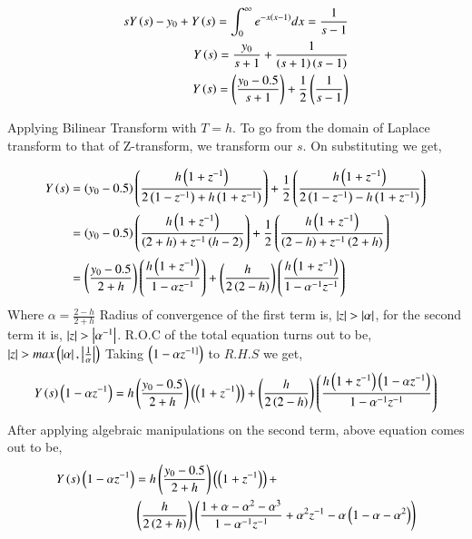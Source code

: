 \documentclass[journal]{IEEEtran}
\begin{document}
\begin{align}
  sY\left(s\right) - y_0 + Y\left(s\right) = \int_0^{\infty} e^{-x\left(x - 1\right) } dx = \frac{1}{s-1}\\
  Y\left(s\right) = \frac{y_0}{s+1} + \frac{1}{\left(s + 1\right) \left(s - 1\right)}\\
  Y\left(s\right) = \left(\frac{y_0 - 0.5}{s+1}\right) + \frac{1}{2}\left(\frac{1}{s-1}\right)
\end{align}

Applying Bilinear Transform with $T=h$. To go from the domain of Laplace transform to that of Z-transform, we transform our $s$. On substituting we get,

\begin{align}
  Y\left(s\right) &= \left(y_0 - 0.5\right)\left(\frac{h\left(1 + z^{-1}\right) }{ 2\left(1 - z^{-1}\right) + h\left(1 + z^{-1}\right) }\right) + \frac{1}{2}\left(\frac{h\left(1 + z^{-1}\right) }{ 2\left(1 - z^{-1}\right) - h\left(1 + z^{-1}\right) }\right)\\
  & = \left(y_0 - 0.5\right)\left(\frac{h\left(1 + z^{-1}\right) }{ \left(2+h\right) + z^{-1}\left(h-2\right) } \right) +\frac{1}{2}\left(\frac{h\left(1 + z^{-1}\right) }{ \left(2-h\right) + z^{-1}\left(2+h\right) } \right)\\
  &= \left(\frac{y_0 - 0.5}{2+h}\right) \left(\frac{h\left(1 + z^{-1}\right)}{1 - \alpha z^{-1}} \right) + \left(\frac{h}{2\left(2-h\right)}\right)\left(\frac{h\left(1+z^{-1}\right)}{1 - \alpha^{-1}z^{-1}}\right)
\end{align}
Where $\alpha = \frac{2-h}{2+h}$ \newline
Radius of convergence of the first term is, $\left\vert z\right\vert > \left\vert\alpha\right\vert$, for the second term it is, $\left\vert z\right\vert > \left\vert\alpha^{-1}\right\vert$. R.O.C of the total equation turns out to be, $\left\vert z\right\vert > max \left(\left\vert\alpha\right\vert, \left\vert\frac{1}{\alpha}\right\vert\right)$\newline
Taking $\left(1 - \alpha z^{-1]}\right)$ to $R.H.S$ we get,
\begin{align}
  Y\left(s\right)\left(1 - \alpha z^{-1}\right) = h\left(\frac{y_0 - 0.5}{2+h}\right)\left(\left(1 + z^{-1}\right) \right) + \left(\frac{h}{2\left(2-h\right)}\right)\left(\frac{h\left(1+z^{-1}\right) \left(1 - \alpha z^{-1}\right) }{1 - \alpha^{-1}z^{-1}}\right)
\end{align}
After applying algebraic manipulations on the second term, above equation comes out to be, 
\begin{align}
  Y\left(s\right)\left(1 - \alpha z^{-1}\right) &= h\left( \frac{y_0 - 0.5}{2+h}\right)\left(\left(1 + z^{-1}\right) \right) + \\
  &\left(\frac{h}{2\left(2+h\right)}\right) \left( \frac{1 + \alpha - \alpha^2 - \alpha^3}{1 - \alpha^{-1}z^{-1}} + \alpha^2 z^{-1} - \alpha \left(1 - \alpha - \alpha^2\right) \right) 
\end{align}
\end{document}
